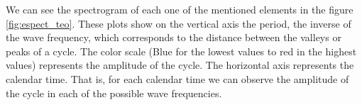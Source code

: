 \documentclass[a4paper,10cpi]{article}
\begin{document}
	We can see the spectrogram of each one of the mentioned elements in the figure \ref{fig:espect_teo}. These plots show on the vertical axis the period, the inverse of the wave frequency, which corresponds to the distance between the valleys or peaks of a cycle. The color scale (Blue for the lowest values to red in the highest values) represents the amplitude of the cycle. The horizontal axis represents the calendar time. That is, for each calendar time we can observe the amplitude of the cycle in each of the possible wave frequencies.
	
	
	\begin{figure}[H]
		\centering
		\vspace{0.00mm}
		\vspace{0.00mm}
		\vspace{0.00mm}

\end{figure}
\end{document}

